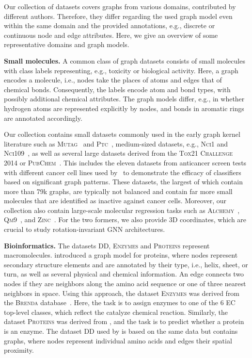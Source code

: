 \documentclass{article}
\newcommand{\xhdr}[1]{{\noindent\bfseries #1}}
\theoremstyle{definition}
\begin{document}
Our collection of datasets covers graphs from various domains, contributed by different authors. Therefore, they differ regarding the used graph model even within the same domain and the provided annotations, e.g., discrete or continuous node and edge attributes. Here, we give an overview of some representative domains and graph models.

\xhdr{Small molecules.} 
A common class of graph datasets consists of small molecules with class labels representing, e.g., toxicity or biological activity. Here, a graph encodes a molecule, i.e., nodes take the places of atoms and edges that of chemical bonds. Consequently, the labels encode atom and bond types, with possibly additional chemical attributes. The graph models differ, e.g., in whether hydrogen atoms are represented explicitly by nodes, and bonds in aromatic rings are annotated accordingly.

Our collection contains small datasets commonly used in the early graph kernel literature such as \textsc{Mutag}~\cite{Deb+1991} and \textsc{Ptc}~\cite{Helma2001}, medium-sized datasets, e.g., \textsc{Nci1} and \textsc{Nci109}~\cite{Wal+2008,She+2011}, as well as several large datasets derived from the \textsc{Tox21 Challenge 2014} or \textsc{PubChem}~\cite{Kim2018}. This includes the eleven datasets from anticancer screen tests with different cancer cell lines used by~\citet{Yan2008} to demonstrate the efficacy of classifiers based on significant graph patterns. These datasets, the largest of which contain more than 79k graphs, are typically not balanced and contain far more small molecules that are identified as inactive against cancer cells. Moreover, our collection also contain large-scale molecular regression tasks such as \textsc{Alchemy}~\cite{Che+2020}, \textsc{Qm9}~\cite{Ram+2014}, and \textsc{Zinc}~\cite{Dwi+2020,Jin+2018a}. For the two formers, we also provide 3D coordinates, which are crucial to study rotation-invariant GNN architectures.

\xhdr{Bioinformatics.}
The datasets \textsc{DD}, \textsc{Enzymes} and \textsc{Proteins} represent macromolecules. \citet{Bor+2005a} introduced a graph model for proteins, where nodes represent secondary structure elements and are annotated by their type, i.e., helix, sheet, or turn, as well as several physical and chemical information. An edge connects two nodes if they are neighbors along the amino acid sequence or one of three nearest neighbors in space. Using this approach, the dataset \textsc{Enzymes} was derived from the \textsc{Brenda} database~\cite{Schomburg2004}. Here, the task is to assign enzymes to one of the 6 EC top-level classes, which reflect the catalyze chemical reaction. Similarly, the dataset \textsc{Proteins} was derived from \citep{Dob+2003}, and the task is to predict whether a protein is an enzyme. The dataset \textsc{DD} used by \citet{She+2011} is based on the same data but contains graphs, where nodes represent individual amino acids and edges their spatial proximity.
\end{document}
